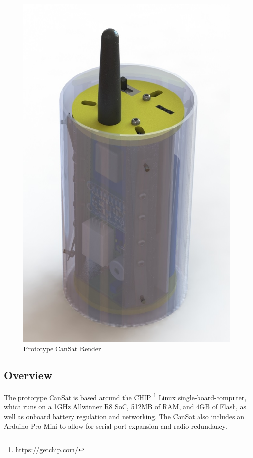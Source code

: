 \documentclass[]{report}
\begin{document}
		\begin{figure}[h]
			\hfill\includegraphics[scale=0.4]{Old_CanSat_render.jpg}\hspace*{\fill}
			\caption{Prototype CanSat Render}
			\label{protcanrend}
		\end{figure}
		
		\subsection{Overview}
		The prototype CanSat is based around the CHIP \footnote{https://getchip.com/} Linux single-board-computer, which runs on a 1GHz Allwinner R8 SoC, 512MB of RAM, and 4GB of Flash, as well as onboard battery regulation and networking. The CanSat also includes an Arduino Pro Mini to allow for serial port expansion and radio redundancy.
		
\end{document}

